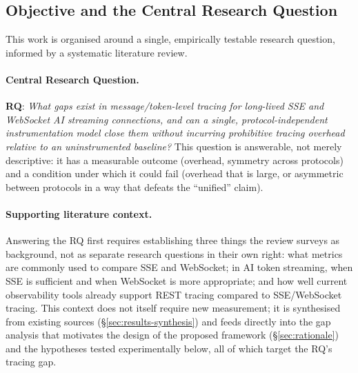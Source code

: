 \documentclass[11pt]{article}
\begin{document}
\subsection{Objective and the Central Research Question}
\label{sec:objectives}
This work is organised around a single, empirically testable research question, informed by a systematic literature review.

\paragraph{Central Research Question.} \textbf{RQ}: \emph{What gaps exist in message/token-level tracing for long-lived SSE and WebSocket AI streaming connections, and can a single, protocol-independent instrumentation model close them without incurring prohibitive tracing overhead relative to an uninstrumented baseline?} This question is answerable, not merely descriptive: it has a measurable outcome (overhead, symmetry across protocols) and a condition under which it could fail (overhead that is large, or asymmetric between protocols in a way that defeats the ``unified'' claim).

\paragraph{Supporting literature context.} Answering the RQ first requires establishing three things the review surveys as background, not as separate research questions in their own right: what metrics are commonly used to compare SSE and WebSocket; in AI token streaming, when SSE is sufficient and when WebSocket is more appropriate; and how well current observability tools already support REST tracing compared to SSE/WebSocket tracing. This context does not itself require new measurement; it is synthesised from existing sources (\S\ref{sec:results-synthesis}) and feeds directly into the gap analysis that motivates the design of the proposed framework (\S\ref{sec:rationale}) and the hypotheses tested experimentally below, all of which target the RQ's tracing gap.
\end{document}
